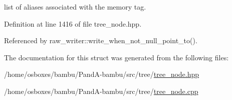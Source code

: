list of aliases associated with the memory tag. 



Definition at line 1416 of file tree\+\_\+node.\+hpp.



Referenced by raw\+\_\+writer\+::write\+\_\+when\+\_\+not\+\_\+null\+\_\+point\+\_\+to().



The documentation for this struct was generated from the following files\+:\begin{DoxyCompactItemize}
\item 
/home/osboxes/bambu/\+Pand\+A-\/bambu/src/tree/\hyperlink{tree__node_8hpp}{tree\+\_\+node.\+hpp}\item 
/home/osboxes/bambu/\+Pand\+A-\/bambu/src/tree/\hyperlink{tree__node_8cpp}{tree\+\_\+node.\+cpp}\end{DoxyCompactItemize}
